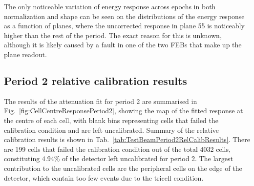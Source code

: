 The only noticeable variation of energy response across epochs in both normalization and shape can be seen on the distributions of the energy response as a function of planes, where the uncorrected response in plane 55 is noticeably higher than the rest of the period. The exact reason for this is unknown, although it is likely caused by a fault in one of the two \glspl{FEB} that make up the plane readout.

\subsection*{Period 2 relative calibration results}

The results of the attenuation fit for period 2 are summarised in Fig.~\ref{fig:CellCentreResponsePeriod2}, showing the map of the fitted response at the centre of each cell, with blank bins representing cells that failed the calibration condition and are left uncalibrated. Summary of the relative calibration results is shown in Tab.~\ref{tab:TestBeamPeriod2RelCalibResults}. There are 199 cells that failed the calibration condition out of the total 4032 cells, constituting 4.94\% of the detector left uncalibrated for period 2. The largest contribution to the uncalibrated cells are the peripheral cells on the edge of the detector, which contain too few events due to the tricell condition.

